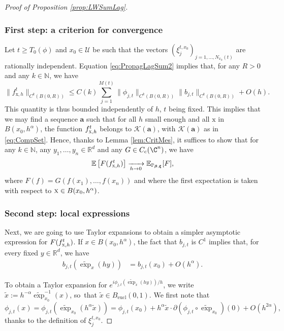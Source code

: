 \documentclass[JEP,XML,SOM,Unicode,published]{cedram}
\let\mathcal\mathscr
\newcommand{\rc}{\mathrm{c}}
\newcommand{\eucl}{\mathrm{eucl}}
\theoremstyle{plain}
\theoremstyle{definition}
\newcommand{\N}{\mathbb{N}}
\newcommand{\R}{\mathbb{R}}
\def\calU{\mathcal{U}}
\begin{document}
\skpt
\begin{proof}[Proof of Proposition \ref{prop:LWSumLag}]

\subsubsection*{First step: a criterion for convergence}

Let $t\geq T_0(\phi)$ and $x_0\in\calU$ be such that the vectors $(\xi_j^{t,x_0})_{j=1,\dots,N_{x_0}(t)}$ are rationally independent.
Equation \eqref{eq:PropagLagSum2} implies that, for any $R>0$ and any $k\in \N$, we have\vspace*{-3pt}
\[
\|f_{\mathrm{x},h}^t\|_{C^k(B(0,R))}\leq C(k) \sum_{j=1}^{M(t)} \|\phi_{j,t}\|_{C^k(B(0,R))} \|b_{j,t}\|_{C^k(B(0,R))} +O(h).
\]
This quantity is thus bounded independently of $h$, $t$ being fixed. This implies that we may find a sequence $\boldsymbol{a}$ such that for all $h$ small enough and all $\mathrm{x}$ in $B(x_0,h^\alpha)$, the function $f^t_{\textsc{x},h}$ belongs to $\mathcal{K}(\boldsymbol{a})$, with $\mathcal{K}(\boldsymbol{a})$ as in \eqref{eq:CompSet}. Hence, thanks to Lemma \ref{lem:CritMes}, it suffices to show that for any $k\in \N$, any $y_1,\dots,y_n\in \R^d$ and any $G\in C_\rc(\C^n)$, we have\vspace*{-3pt}
\[
\mathbb{E} \left[F(f^t_{\textsc{x},h})\right] \xrightarrow[h \to 0]{} \mathbb{E}_{\mathbb{P}_{\boldsymbol{\beta},\boldsymbol{\xi}}}[ F],
\]
where $F(f) = G(f(x_1), \dots, f(x_n))$ and where
the first expectation is taken with respect to $\textsc{x}\in B(x_0, h^\alpha)$.

\subsubsection*{Second step: local expressions}

Next, we are going to use Taylor expansions to obtain a simpler asymptotic expression for $F(f^t_{\textsc{x},h})$. If $x\in B(x_0, h^{\alpha})$, the fact that $b_{j,t}$ is $C^1$ implies that, for every fixed $y \in \R^d$, we have
\begin{align*}
b_{j,t}(\widetilde{\exp}_x(hy))&= b_{j,t}(x_0) + O(h^\alpha).
\end{align*}

To obtain a Taylor expansion for $e^{i\phi_{j,t}(\widetilde{\exp}_x(hy))/h}$, we write $\tilde{x}:= h^{-\alpha} \widetilde{\exp}_{x_0}^{-1}(x)$, so~that $\tilde{x} \in B_{\eucl}(0,1)$.
We first note that
\[
\phi_{j,t}(x)= \phi_{j,t}(\widetilde{\exp}_{x_0}(h^{\alpha} \tilde{x})) = \phi_{j,t}(x_0) + h^\alpha \tilde{x} \cdot \partial \left(\phi_{j,t}\circ \widetilde{\exp}_{x_0} \right)(0) + O(h^{2\alpha}),
\]
thanks to the definition of $\xi_j^{t, x_0}$.


\end{proof}
\end{document}
